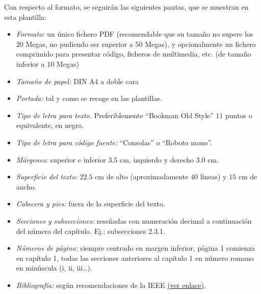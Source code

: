 Con respecto al formato, se seguirán las siguientes pautas, que se muestran en esta plantilla:
\begin{itemize}
\item \textit{Formato:} un único fichero PDF (recomendable que su tamaño no supere los $20$ Megas, no pudiendo ser superior a $50$ Megas), y opcionalmente un fichero comprimido para presentar código, ficheros de multimedia, etc. (de tamaño inferior a $10$ Megas)
\item \textit{Tamaño de papel:} DIN A4 a doble cara
\item \textit{Portada:} tal y como se recoge en las plantillas.
\item \textit{Tipo de letra para texto.} Preferiblemente ``Bookman Old Style'' $11$ puntos o equivalente, en negro.
\item \textit{Tipo de letra para código fuente:} ``Consolas'' o ``Roboto mono''.
\item \textit{Márgenes:} superior e inferior $3.5$ cm, izquierdo y derecho $3.0$ cm.
\item \textit{Superficie del texto:} $22.5$ cm de alto (aproximadamente $40$ líneas) y $15$ cm de ancho.
\item \textit{Cabecera y pies:} fuera de la superficie del texto.
\item \textit{Secciones y subsecciones:} reseñadas con numeración decimal a continuación del número del capítulo. Ej.: subsecciones 2.3.1.
\item \textit{Números de página:} siempre centrado en margen inferior, página 1 comienza en capítulo 1, todas las secciones anteriores al capítulo 1 en número romano en minúscula (i, ii, iii…).
\item \textit{Bibliografía:} según recomendaciones de la IEEE
\href{https://www.etsiinf.upm.es/docs/estudios/grado/1475_ieeecitationref.pdf}{(ver enlace)}.
\end{itemize}

\medskip

